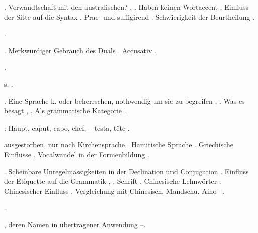 \begin{register}


 \pageref{sp.142}. Verwandtschaft mit den australischen? \pageref{sp.147}, \pageref{sp.152}. Haben keinen Wortaccent \pageref{sp.148}\sed{, \pageref{sp.150}}. Einfluss der Sitte auf die Syntax \pageref{sp.249}. Prae- und suffigirend \pageref{sp.348}. Schwierigkeit der Beurtheilung \pageref{sp.426}.

 \pageref{sp.281}.

. Merkwürdiger Gebrauch des Duals \pageref{sp.249}. Accusativ \pageref{sp.358}.

 \pageref{sp.282}.

 s. .

. Eine Sprache k. oder beherrschen, nothwendig um sie zu begreifen \pageref{sp.61}, \pageref{sp.82}. Was es besagt \pageref{sp.84}, \pageref{sp.89}. Als grammatische Kategorie \pageref{sp.103}.

: Haupt, caput, capo, chef, – testa, tête \pageref{sp.232}.

 ausgestorben, nur noch Kirchensprache \pageref{sp.147}. Hamitische Sprache \pageref{sp.160}\sed{, \pageref{sp.282}}. Griechische Einflüsse \pageref{sp.272}.  Vocalwandel in der Formenbildung \pageref{sp.354}. 


. Scheinbare Unregelmässigkeiten in der Declination und Conjugation \pageref{sp.87}. Einfluss der Etiquette auf die Grammatik \pageref{sp.95}, \pageref{sp.246}.  Schrift \pageref{sp.129}.  Chinesische Lehnwörter \pageref{sp.266}.  Chinesischer Einfluss \pageref{sp.271}. Vergleichung mit Chinesisch, Mandschu, Aino \pageref{sp.290}–\pageref{sp.291}. 

 \pageref{sp.147}.

, deren Namen in übertragener Anwendung \pageref{sp.40}–\pageref{sp.41}.


\end{register}
